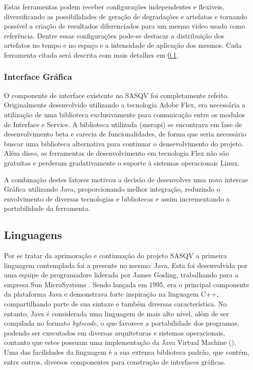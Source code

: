Estas ferramentas podem receber configurações independentes e flexíveis, diversificando as possibilidades de geração de degradações e artefatos e tornando possível a criação de resultados diferenciados para um mesmo vídeo usado como referência. Dentre essas configurações pode-se destacar a distribuição dos artefatos no tempo e no espaço e a intensidade de aplicação dos mesmos. Cada ferramenta citada será descrita com mais detalhes em \ref{}. %

\subsubsection{Interface Gráfica}

O componente de interface existente no SASQV foi completamente refeito.
Originalmente desenvolvido utilizando a tecnologia Adobe Flex, era necessária a utilização de uma biblioteca exclusivamente para comunicação entre os modulos de Interface e Service. A biblioteca utilizada (merapi) se encontrava em fase de desenvolvimento beta e carecia de funcionalidades, de forma que seria necessário buscar uma biblioteca alternativa para continuar o densevolvimento do projeto.
Além disso, as ferramentas de desenvolvimento em tecnologia Flex não são gratuitas e perderam gradativamente o suporte à sistemas operacionais Linux.

A combinação destes fatores motivou a decisão de desenvolver uma nova intercae Gráfica utilizando Java, proporcionando melhor integração, reduzindo o envolvimento de diversas tecnologias e bibliotecas e assim incrementando a portabilidade da ferramenta.

\subsection{Linguagens}

Por se tratar da aprimoração e continuação do projeto SASQV a primeira linguagem contemplada foi a presente no mesmo: Java. 
Esta foi desenvolvida por uma equipe de programadore liderada por James Gosling, trabalhando para a empresa Sun MicroSystems \cite{wikijava}. Sendo lançada em 1995, era o principal componente da plataforma Java e demonstrava forte inspiração na linguagem C++, compartilhando parte de sua sintaxe e também diversas característica. 
No entanto, Java é considerada uma linguagem de mais alto nível, além de ser compilada no formato \emph{bytecode}, o que favorece a portabilidade dos programas, podendo ser executados em diversas arquiteturas e sistemas operacionais, contanto que estes possuam uma implementação da Java Virtual Machine (). Uma das facilidades da linguagem é a sua extensa biblioteca padrão, que contém, entre outros, diversos componentes para construção de interfaces gráficas.


